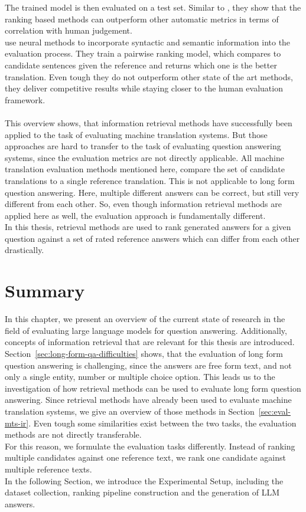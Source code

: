 The trained model is then evaluated on a test set.
Similar to \cite{duh:2008}, they show that the ranking based methods can outperform other automatic metrics in terms of correlation with human judgement.
\\
\cite{guzman:2019} use neural methods to incorporate syntactic and semantic information into the evaluation process.
They train a pairwise ranking model, which compares to candidate sentences given the reference and returns which one is the better translation.
Even tough they do not outperform other state of the art methods, they deliver competitive results while staying closer to the human evaluation framework.
\\
\\
This overview shows, that information retrieval methods have successfully been applied to the task of evaluating machine translation systems.
But those approaches are hard to transfer to the task of evaluating question answering systems, since the evaluation metrics are not directly applicable.
All machine translation evaluation methods mentioned here, compare the set of candidate translations to a single reference translation.
This is not applicable to long form question answering.
Here, multiple different answers can be correct, but still very different from each other.
So, even though information retrieval methods are applied here as well, the evaluation approach is fundamentally different.
\\
In this thesis, retrieval methods are used to rank generated answers for a given question against a set of rated reference answers which can differ from each other drastically.

\section{Summary}
In this chapter, we present an overview of the current state of research in the field of evaluating large language models for question answering.
Additionally, concepts of information retrieval that are relevant for this thesis are introduced.
\\
Section~\ref{sec:long-form-qa-difficulties} shows, that the evaluation of long form question answering is challenging, since the answers are free form text, and not only a single entity, number or multiple choice option.
This leads us to the investigation of how retrieval methods can be used to evaluate long form question answering.
Since retrieval methods have already been used to evaluate machine translation systems, we give an overview of those methods in Section~\ref{sec:eval-mts-ir}.
Even tough some similarities exist between the two tasks, the evaluation methods are not directly transferable.
\\
For this reason, we formulate the evaluation tasks differently.
Instead of ranking multiple candidates against one reference text, we rank one candidate against multiple reference texts.
\\
In the following Section, we introduce the Experimental Setup, including the dataset collection, ranking pipeline construction and the generation of LLM answers.